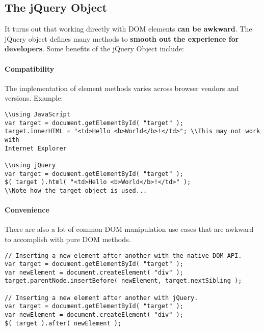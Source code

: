 \documentclass[10pt,letterpaper]{book}
\begin{document}
\subsection{The jQuery Object}
It turns out that working directly with DOM elements \textbf{can be awkward}. The jQuery object defines many methods to \textbf{smooth out the experience for developers}. Some benefits of the jQuery Object include:\\

\paragraph{Compatibility} The implementation of element methods varies across browser vendors and versions. Example:
\begin{lstlisting}
\\using JavaScript
var target = document.getElementById( "target" );
target.innerHTML = "<td>Hello <b>World</b>!</td>"; \\This may not work with 
Internet Explorer

\\using jQuery
var target = document.getElementById( "target" );
$( target ).html( "<td>Hello <b>World</b>!</td>" );
\\Note how the target object is used...
\end{lstlisting}
\paragraph{Convenience} There are also a lot of common DOM manipulation use cases that are awkward to accomplish with pure DOM methods.
\begin{lstlisting}
// Inserting a new element after another with the native DOM API.
var target = document.getElementById( "target" );
var newElement = document.createElement( "div" );
target.parentNode.insertBefore( newElement, target.nextSibling );

// Inserting a new element after another with jQuery.
var target = document.getElementById( "target" );
var newElement = document.createElement( "div" );
$( target ).after( newElement );
\end{lstlisting}
\end{document}
